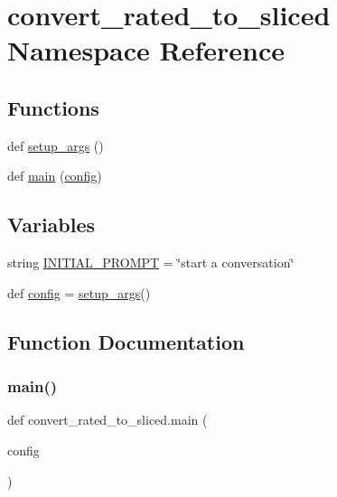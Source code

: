 \hypertarget{namespaceconvert__rated__to__sliced}{}\section{convert\+\_\+rated\+\_\+to\+\_\+sliced Namespace Reference}
\label{namespaceconvert__rated__to__sliced}
\subsection*{Functions}
\begin{DoxyCompactItemize}
\item 
def \hyperlink{namespaceconvert__rated__to__sliced_a23f7c33059f21fbae93c8c8d71e3a4b5}{setup\+\_\+args} ()
\item 
def \hyperlink{namespaceconvert__rated__to__sliced_ad4fd35247a4e417615638391b9db7710}{main} (\hyperlink{namespaceconvert__rated__to__sliced_ab6239e6254abfbdd7cc29d0d45cfe739}{config})
\end{DoxyCompactItemize}
\subsection*{Variables}
\begin{DoxyCompactItemize}
\item 
string \hyperlink{namespaceconvert__rated__to__sliced_a4469c47037c02ecb8c7899cd5803b508}{I\+N\+I\+T\+I\+A\+L\+\_\+\+P\+R\+O\+M\+PT} = \char`\"{}start a conversation\char`\"{}
\item 
def \hyperlink{namespaceconvert__rated__to__sliced_ab6239e6254abfbdd7cc29d0d45cfe739}{config} = \hyperlink{namespaceconvert__rated__to__sliced_a23f7c33059f21fbae93c8c8d71e3a4b5}{setup\+\_\+args}()
\end{DoxyCompactItemize}


\subsection{Function Documentation}
\mbox{\label{namespaceconvert__rated__to__sliced_ad4fd35247a4e417615638391b9db7710}} 
\subsubsection{\texorpdfstring{main()}{main()}}
{\footnotesize\ttfamily def convert\+\_\+rated\+\_\+to\+\_\+sliced.\+main (\begin{DoxyParamCaption}\item[{}]{config }\end{DoxyParamCaption})}

